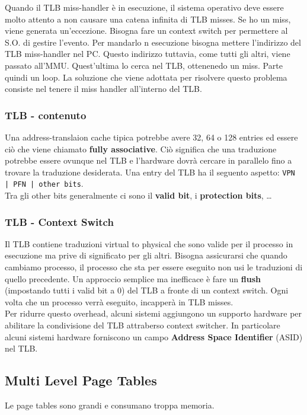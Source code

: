 \documentclass[12pt, letterpaper]{article}
\begin{document}
				Quando il TLB miss-handler è in esecuzione, il sistema operativo deve essere molto attento a non causare una catena infinita di TLB misses. Se ho un miss, viene generata un'eccezione. Bisogna fare un context switch per permettere al S.O. di gestire l'evento. Per mandarlo n esecuzione bisogna mettere l'indirizzo del TLB miss-handler nel PC. Questo indirizzo tuttavia, come tutti gli altri, viene passato all'MMU. Quest'ultima lo cerca nel TLB, ottenenedo un miss. Parte quindi un loop. La soluzione che viene adottata per risolvere questo problema consiste nel tenere il miss handler all'interno del TLB.
				
				
			\subsubsection{TLB - contenuto}
				Una address-translaion cache tipica potrebbe avere 32, 64 o 128 entries ed essere ciò che viene chiamato \textbf{fully associative}. Ciò significa che una traduzione potrebbe essere ovunque nel TLB e l'hardware dovrà cercare in parallelo fino a trovare la traduzione desiderata. Una entry del TLB ha il seguento aspetto: \texttt{VPN | PFN | other bits}.\\
				Tra gli other bits generalmente ci sono il \textbf{valid bit}, i \textbf{protection bits}, \dots
				
			\subsubsection{TLB - Context Switch}
				Il TLB contiene traduzioni virtual to physical che sono valide per il processo in esecuzione ma prive di significato per gli altri. Bisogna assicurarsi che quando cambiamo processo, il processo che sta per essere eseguito non usi le traduzioni di quello precedente. Un approccio semplice ma inefficace è fare un \textbf{flush} (impostando tutti i valid bit a 0) del TLB a fronte di un context switch. Ogni volta che un processo verrà eseguito, incapperà in TLB misses.\\
				Per ridurre questo overhead, alcuni sistemi aggiungono un supporto hardware per abilitare la condivisione del TLB attraberso context switcher. In particolare alcuni sistemi hardware forniscono un campo \textbf{Address Space Identifier} (ASID) nel TLB. 
				
		\subsection{Multi Level Page Tables}		
			Le page tables sono grandi e consumano troppa memoria. 
			
\end{document}
